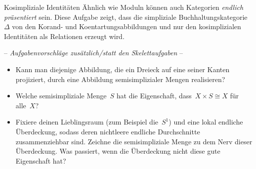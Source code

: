\documentclass{uebblatt}
\begin{document}
\begin{aufgabe}{Kosimpliziale Identitäten}
Ähnlich wie Moduln können auch Kategorien \emph{endlich präsentiert} sein.
Diese Aufgabe zeigt, dass die simpliziale Buchhaltungskategorie~$\Delta$ von
den Korand- und Koentartungsabbildungen und nur den kosimplizialen Identitäten als
Relationen erzeugt wird.
\end{aufgabe}

\newpage

\begin{center}-- \emph{Aufgabenvorschläge zusätzlich/statt den Skelettaufgaben}
--\end{center}

\begin{itemize}
\item Kann man diejenige Abbildung, die ein Dreieck auf eine seiner Kanten
projiziert, durch eine Abbildung semisimplizialer Mengen realisieren?
\item Welche semisimpliziale Menge~$S$ hat die Eigenschaft, dass~$X \times S
\cong X$ für alle~$X$?
\item Fixiere deinen Lieblingsraum (zum Beispiel die~$S^1$) und eine lokal
endliche Über\-dec\-kung, sodass deren nichtleere endliche Durchschnitte
zusammenziehbar sind. Zeichne die semisimpliziale Menge zu dem Nerv dieser
Überdeckung. Was passiert, wenn die Überdeckung nicht diese gute Eigenschaft
hat?
\end{itemize}
\end{document}
